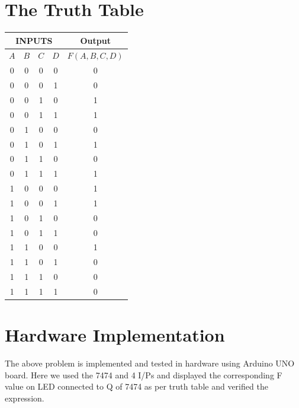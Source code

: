 \documentclass[a4paper,12pt]{article}
\begin{document}
\section*{\textbf{The Truth Table}}
\begin{center}
\begin{tabular}{|c|c|c|c|c|}
\hline
	\multicolumn{4}{|c|}{\textbf{INPUTS}} & \textbf{Output} \\ 
\hline
	$A$ & $B$ & $C$ & $D$ & $F(A,B,C,D)$ \\
\hline
0 & 0 & 0 & 0 & 0 \\ 
0 & 0 & 0 & 1 & 0 \\ 
0 & 0 & 1 & 0 & 1 \\ 
0 & 0 & 1 & 1 & 1 \\ 
0 & 1 & 0 & 0 & 0 \\ 
0 & 1 & 0 & 1 & 1 \\ 
0 & 1 & 1 & 0 & 0 \\ 
0 & 1 & 1 & 1 & 1 \\ 
1 & 0 & 0 & 0 & 1 \\ 
1 & 0 & 0 & 1 & 1 \\ 
1 & 0 & 1 & 0 & 0 \\ 
1 & 0 & 1 & 1 & 0 \\ 
1 & 1 & 0 & 0 & 1 \\ 
1 & 1 & 0 & 1 & 0 \\ 
1 & 1 & 1 & 0 & 0 \\ 
1 & 1 & 1 & 1 & 0 \\ 
\hline
\end{tabular}
\end{center}
\section*{\textbf{Hardware Implementation}}
The above problem is implemented and tested in hardware using Arduino UNO board. Here we used the 7474 and 4 I/Ps and displayed the corresponding F value on LED connected to Q of 7474 as per truth table and verified the expression.
\end{document}
